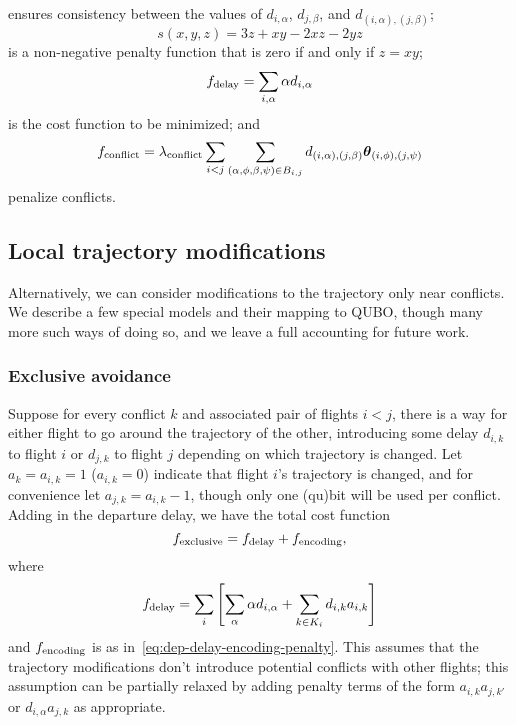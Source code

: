 ensures consistency between the values of $d_{i,\alpha}$, $d_{j, \beta}$, and $d_{(i, \alpha), (j, \beta)}$;
\begin{equation}
s(x, y, z) = 3z + xy - 2xz - 2 yz
\end{equation}
is a non-negative penalty function that is zero if and only if $z = xy$;
\begin{equation}
f_{\mathrm{delay}}
= \sum_{i, \alpha} \alpha d_{i, \alpha}
\end{equation}
is the cost function to be minimized; and
\begin{equation}
  f_{\mathrm{conflict}}
=
\lambda_{\mathrm{conflict}}
\sum_{i < j} 
\sum_{(\alpha, \phi, \beta, \psi) \in B_{i, j}} 
d_{(i, \alpha), (j, \beta)} \boldsymbol \theta_{(i, \phi), (j, \psi)}
\end{equation}
penalize conflicts.

\subsection{Local trajectory modifications}

Alternatively, we can consider modifications to the trajectory only near conflicts.
We describe a few special models and their mapping to QUBO,
though many more such ways of doing so, and we leave a full accounting for future work.

\subsubsection{Exclusive avoidance}
Suppose for every conflict $k$ and associated pair of flights $i < j$, there is a way for either flight to go around the trajectory of the other, introducing some delay $d_{i,k}$ to flight $i$ or $d_{j, k}$ to flight $j$ depending on which trajectory is changed.
Let $a_k = a_{i, k} = 1$ ($a_{i, k} = 0$) indicate that flight $i$'s trajectory is changed, and for convenience let $a_{j, k} = a_{i, k} - 1$, though only one (qu)bit will be used per conflict. %
Adding in the departure delay, we have the total cost function
\begin{equation}
f_{\mathrm{exclusive}}
=
f_{\mathrm{delay}} +
f_{\mathrm{encoding}},
\end{equation}
where 
\begin{equation}
\label{eq:delay-exclusive}
f_{\mathrm{delay}} = 
\sum_{i}
\left[
\sum_{\alpha} \alpha d_{i, \alpha}
+
\sum_{k \in K_i} d_{i, k} a_{i, k}
\right]
\end{equation}
and
$f_{\mathrm{encoding}}$ is as in~\eqref{eq:dep-delay-encoding-penalty}.
This assumes that the trajectory modifications don't introduce potential conflicts with other flights; this assumption can be partially relaxed by adding penalty terms of the form $a_{i,k} a_{j,k'}$ or $d_{i,\alpha} a_{j, k}$ as appropriate.

